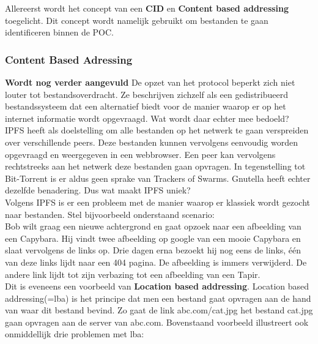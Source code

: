 Allereerst wordt het concept van een \textbf{CID} en \textbf{Content based addressing} toegelicht. Dit concept wordt namelijk gebruikt om bestanden te gaan identificeren binnen de POC. 

\subsubsection{Content Based Adressing}
\label{CBA}
\textbf{Wordt nog verder aangevuld}
 De opzet van het protocol beperkt zich niet louter tot bestandsoverdracht. Ze beschrijven zichzelf als een gedistribueerd bestandssysteem dat een alternatief biedt voor de manier waarop er op het internet informatie wordt opgevraagd. Wat wordt daar echter mee bedoeld?\\

IPFS heeft als doelstelling om alle bestanden op het netwerk te gaan verspreiden over verschillende peers. Deze bestanden kunnen vervolgens eenvoudig worden opgevraagd en weergegeven in een webbrowser. Een peer kan vervolgens rechtstreeks aan het netwerk deze bestanden gaan opvragen. In tegenstelling tot Bit-Torrent is er aldus geen sprake van Trackers of Swarms. Gnutella heeft echter dezelfde benadering. Dus wat maakt IPFS uniek?\\

Volgens IPFS is er een probleem met de manier waarop er klassiek wordt gezocht naar bestanden. Stel bijvoorbeeld onderstaand scenario:\\

Bob wilt graag een nieuwe achtergrond en gaat opzoek naar een afbeelding van een Capybara. Hij vindt twee afbeelding op google van een mooie Capybara en slaat vervolgens de links op. Drie dagen erna bezoekt hij nog eens de links, één van deze links lijdt naar een 404 pagina. De afbeelding is immers verwijderd. De andere link lijdt tot zijn verbazing tot een afbeelding van een Tapir.\\

Dit is eveneens een voorbeeld van \textbf{Location based addressing}. Location based addressing(=lba) is het principe dat men een bestand gaat opvragen aan de hand van waar dit bestand bevind. Zo gaat de link abc.com/cat.jpg het bestand cat.jpg gaan opvragen aan de server van abc.com. Bovenstaand voorbeeld illustreert ook onmiddellijk drie problemen met lba:

